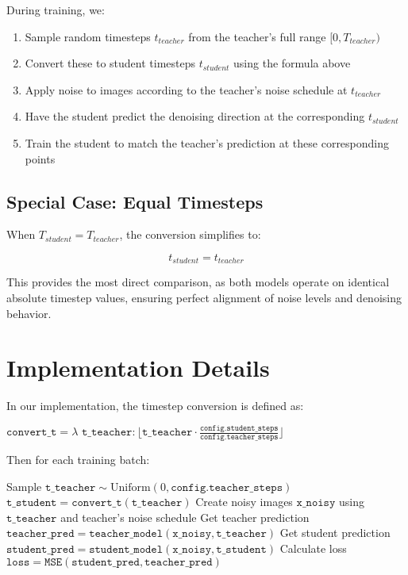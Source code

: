 \documentclass{article}
\begin{document}
During training, we:
\begin{enumerate}
  \item Sample random timesteps $t_{teacher}$ from the teacher's full range $[0, T_{teacher})$
  \item Convert these to student timesteps $t_{student}$ using the formula above
  \item Apply noise to images according to the teacher's noise schedule at $t_{teacher}$
  \item Have the student predict the denoising direction at the corresponding $t_{student}$
  \item Train the student to match the teacher's prediction at these corresponding points
\end{enumerate}

\subsection{Special Case: Equal Timesteps}

When $T_{student} = T_{teacher}$, the conversion simplifies to:

\begin{equation}
t_{student} = t_{teacher}
\end{equation}

This provides the most direct comparison, as both models operate on identical absolute timestep values, ensuring perfect alignment of noise levels and denoising behavior.

\section{Implementation Details}

In our implementation, the timestep conversion is defined as:

\begin{algorithm}[H]
\begin{algorithmic}
\STATE $\texttt{convert\_t} = \lambda \texttt{ t\_teacher}: \lfloor\texttt{t\_teacher} \cdot \frac{\texttt{config.student\_steps}}{\texttt{config.teacher\_steps}}\rfloor$
\end{algorithmic}
\end{algorithm}

Then for each training batch:

\begin{algorithm}[H]
\begin{algorithmic}
\STATE Sample $\texttt{t\_teacher} \sim \text{Uniform}(0, \texttt{config.teacher\_steps})$
\STATE $\texttt{t\_student} = \texttt{convert\_t}(\texttt{t\_teacher})$
\STATE Create noisy images $\texttt{x\_noisy}$ using $\texttt{t\_teacher}$ and teacher's noise schedule
\STATE Get teacher prediction $\texttt{teacher\_pred} = \texttt{teacher\_model}(\texttt{x\_noisy}, \texttt{t\_teacher})$
\STATE Get student prediction $\texttt{student\_pred} = \texttt{student\_model}(\texttt{x\_noisy}, \texttt{t\_student})$
\STATE Calculate loss $\texttt{loss} = \texttt{MSE}(\texttt{student\_pred}, \texttt{teacher\_pred})$
\end{algorithmic}
\end{algorithm}
\end{document}
